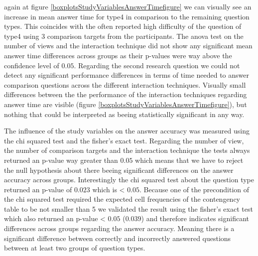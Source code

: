 again at figure \ref{boxplotsStudyVariablesAnswerTimefigure} we can visually see an increase in mean answer time for type4 in comparison to the remaining question types.
This coincides with the often reported high difficulty of the question of type4 using 3 comparison targets from the participants.
The anova test on the number of views and the interaction technique did not show any significant mean answer time differences across groups as their p-values were way above
the confidence level of $0.05$. Regarding the second research question we could not detect any significant performance differences in terms of time needed to answer comparison questions
across the different interaction techniques. Visually small differences between the the performance of the interaction techniques regarding answer time are visible
(figure \ref{boxplotsStudyVariablesAnswerTimefigure}), but nothing that could be interpreted as beeing statistically significant in any way.

The influence of the study variables on the answer accuracy was measured using the chi squared test and the fisher's exact test. Regarding the
number of view, the number of comparison targets and the interaction technique the tests always returned an p-value way greater than $0.05$ which means
that we have to reject the null hypothesis about there beeing significant differences on the answer accuracy across groups. Interestingly the
chi squared test about the question type returned an p-value of $0.023$ which is < $0.05$. Because one of the precondition of the chi squared test
required the expected cell frequencies of the contengency table to be not smaller than 5 we validated the result using the fisher's exact test which also
returned an p-value < $0.05$ ($0.039$) and therefore indicates significant differences across groups regarding the answer accuracy. Meaning there is a significant
difference between correctly and incorrectly answered questions between at least two groups of question types.


